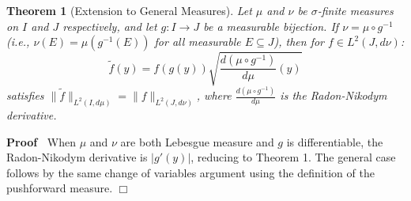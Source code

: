 \documentclass{article}
\newenvironment{proof}{\noindent\textbf{Proof\ }}{\hspace*{\fill}$\Box$\medskip}
\newtheorem{theorem}{Theorem}
\begin{document}
\begin{theorem}
  [Extension to General Measures] Let $\mu$ and $\nu$ be $\sigma$-finite
  measures on $I$ and $J$ respectively, and let $g : I \to J$ be a measurable
  bijection. If $\nu = \mu \circ g^{- 1}$ (i.e., $\nu (E) = \mu (g^{- 1} (E))$
  for all measurable $E \subseteq J$), then for $f \in L^2 (J, d \nu)$:
  \begin{equation}
    \tilde{f} (y) = f (g (y)) \sqrt{\frac{d (\mu \circ g^{- 1})}{d \mu} (y)}
  \end{equation}
  satisfies $\| \tilde{f} \|_{L^2 (I, d \mu)} = \|f\|_{L^2 (J, d \nu)}$, where
  $\frac{d (\mu \circ g^{- 1})}{d \mu}$ is the Radon-Nikodym derivative.
\end{theorem}

\begin{proof}
  When $\mu$ and $\nu$ are both Lebesgue measure and $g$ is differentiable,
  the Radon-Nikodym derivative is $|g' (y) |$, reducing to Theorem 1. The
  general case follows by the same change of variables argument using the
  definition of the pushforward measure.
\end{proof}
\end{document}
